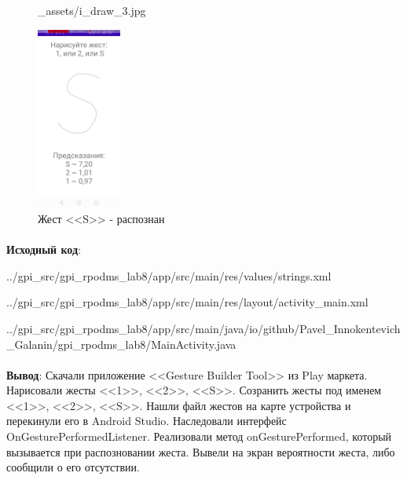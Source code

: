 \documentclass[12pt, a4paper, simple]{eskdtext}
\begin{document}
\begin{figure}[!h]
\begin{minipage}{0.24\textwidth}
                {_assets/i_draw_3.jpg}
            \caption{Жест <<3>> - не существует}
            \label{fig:i_draw_3}
        \end{minipage}
        \begin{minipage}{0.24\textwidth}
            \centering
            \includegraphics[height=6cm]
                {_assets/i_draw_S.jpg}
            \caption{Жест <<S>> - распознан}
            \label{fig:i_draw_S}
        \end{minipage}
    \end{figure}

    \newpage
    
    \paragraph{} \textbf{Исходный код}: 

    
        {../gpi_src/gpi_rpodms_lab8/app/src/main/res/values/strings.xml}

    
        {../gpi_src/gpi_rpodms_lab8/app/src/main/res/layout/activity_main.xml}

    
        {../gpi_src/gpi_rpodms_lab8/app/src/main/java/io/github/Pavel_Innokentevich_Galanin/gpi_rpodms_lab8/MainActivity.java}

    \paragraph{} \textbf{Вывод}:
    Скачали приложение <<Gesture Builder Tool>> из Play маркета.
    Нарисовали жесты <<1>>, <<2>>, <<S>>.
    Созранить жесты под именем <<1>>, <<2>>, <<S>>.
    Нашли файл жестов на карте устройства и перекинули его в Android Studio. 
    Наследовали интерфейс OnGesturePerformedListener.
    Реализовали метод onGesturePerformed, который вызывается при распозновании жеста.
    Вывели на экран вероятности жеста, либо сообщили о его отсутствии.
\end{document}
